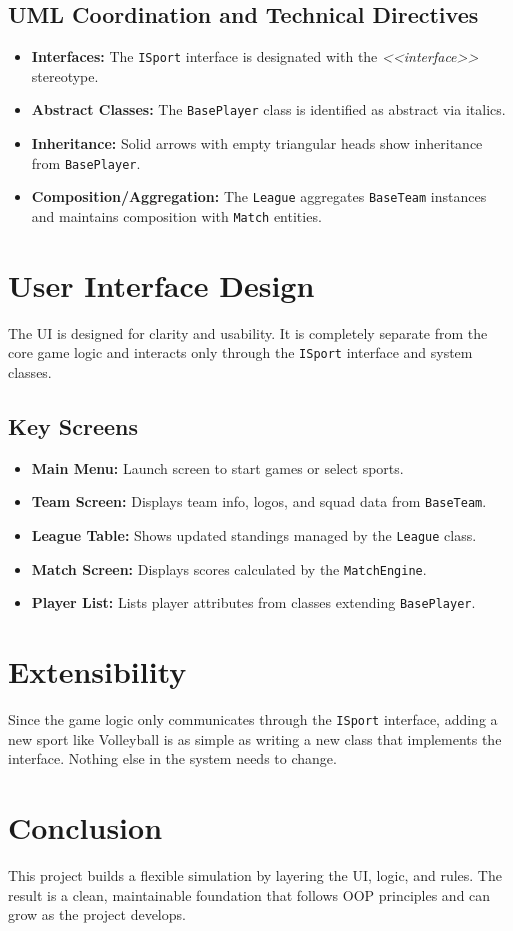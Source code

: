 \documentclass[12pt]{article}
\begin{document}
\subsection{UML Coordination and Technical Directives}
\begin{itemize}
    \item \textbf{Interfaces:} The \texttt{ISport} interface is designated with the \textit{<<interface>>} stereotype.
    \item \textbf{Abstract Classes:} The \texttt{BasePlayer} class is identified as abstract via italics.
    \item \textbf{Inheritance:} Solid arrows with empty triangular heads show inheritance from \texttt{BasePlayer}.
    \item \textbf{Composition/Aggregation:} The \texttt{League} aggregates \texttt{BaseTeam} instances and maintains composition with \texttt{Match} entities.
\end{itemize}

\newpage

\section{User Interface Design}
The UI is designed for clarity and usability. It is completely separate from the core game logic and interacts only through the \texttt{ISport} interface and system classes.

\subsection{Key Screens}
\begin{itemize}
    \item \textbf{Main Menu:} Launch screen to start games or select sports.
    \item \textbf{Team Screen:} Displays team info, logos, and squad data from \texttt{BaseTeam}.
    \item \textbf{League Table:} Shows updated standings managed by the \texttt{League} class.
    \item \textbf{Match Screen:} Displays scores calculated by the \texttt{MatchEngine}.
    \item \textbf{Player List:} Lists player attributes from classes extending \texttt{BasePlayer}.
\end{itemize}

\section{Extensibility}
Since the game logic only communicates through the \texttt{ISport} interface, adding a new sport like Volleyball is as simple as writing a new class that implements the interface. Nothing else in the system needs to change.

\section{Conclusion}
This project builds a flexible simulation by layering the UI, logic, and rules. The result is a clean, maintainable foundation that follows OOP principles and can grow as the project develops.
\end{document}
